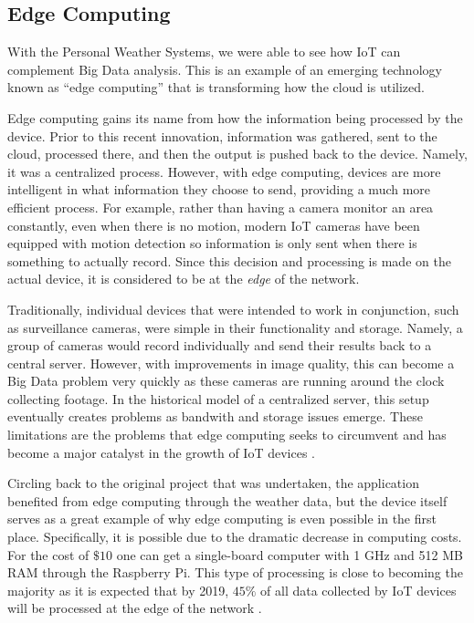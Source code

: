\documentclass[sigconf]{acmart}
\begin{document}
\subsection{Edge Computing}
With the Personal Weather Systems, we were able to see how IoT can complement Big Data analysis. This is an example of an emerging technology known as ``edge computing'' that is transforming how the cloud is utilized. 

Edge computing gains its name from how the information being processed by the device.  Prior to this recent innovation, information was gathered, sent to the cloud, processed there, and then the output is pushed back to the device. Namely, it was a centralized process. However, with edge computing, devices are more intelligent in what information they choose to send, providing a much more efficient process. For example, rather than having a camera monitor an area constantly, even when there is no motion, modern IoT cameras have been equipped with motion detection so information is only sent when there is something to actually record. Since this decision and processing is made on the actual device, it is considered to be at the \emph{edge} of the network.

Traditionally, individual devices that were intended to work in conjunction, such as surveillance cameras, were simple in their functionality and storage. Namely, a group of cameras would record individually and send their results back to a central server. However, with improvements in image quality, this can become a Big Data problem very quickly as these cameras are running around the clock collecting footage. In the historical model of a centralized server, this setup eventually creates problems as bandwith and storage issues emerge. These limitations are the problems that edge computing seeks to circumvent and has become a major catalyst in the growth of IoT devices \cite{edge}.   

Circling back to the original project that was undertaken, the application benefited from edge computing through the weather data, but the device itself serves as a great example of why edge computing is even possible in the first place. Specifically, it is possible due to the dramatic decrease in computing costs. For the cost of $\$10$ one can get a single-board computer with 1 GHz and 512 MB RAM through the Raspberry Pi. This type of processing is close to becoming the majority as it is expected that by 2019, $45\%$ of all data collected by IoT devices will be processed at the edge of the network \cite{msft}. 
\end{document}
